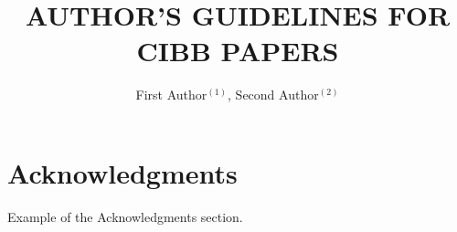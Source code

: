 \documentclass[12pt,a4paper]{cibb}
\title{\large $\ $\\ \bf AUTHOR'S GUIDELINES FOR CIBB PAPERS}
\author{ First Author$^{(1)}$, Second Author$^{(2)}$}
\begin{document}
\thispagestyle{myheadings}
\pagestyle{myheadings}







\section*{\bf Acknowledgments}

Example of the Acknowledgments section.




{\fontsize{10}{10}\selectfont
\begin{thebibliography}{99}
\setlength{\parskip}{0pt}


\end{thebibliography}
}
\end{document}
